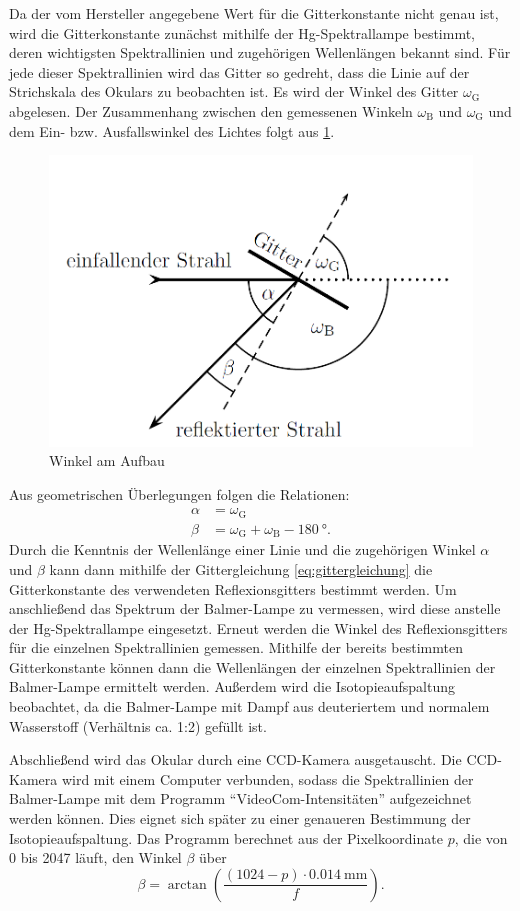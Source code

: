 \indent Da der vom Hersteller angegebene Wert für die Gitterkonstante nicht genau ist, wird die Gitterkonstante zunächst mithilfe der Hg-Spektrallampe bestimmt,
deren wichtigsten Spektrallinien und zugehörigen Wellenlängen bekannt sind. Für jede dieser Spektrallinien wird das Gitter so gedreht, dass die Linie auf der Strichskala
des Okulars zu beobachten ist. Es wird der Winkel des Gitter $\omega_{\mathrm{G}}$ abgelesen. Der Zusammenhang zwischen den gemessenen Winkeln $\omega_{\mathrm{B}}$ und $\omega_{\mathrm{G}}$
und dem Ein- bzw. Ausfallswinkel des Lichtes folgt aus \cref{fig:winkel_am_aufbau}.
\begin{figure}[H]
	\centering
	\includegraphics[width=0.5\linewidth]{../figs/winkel_am_aufbau.png}
	\caption{Winkel am Aufbau \cite{skript}}
	\label{fig:winkel_am_aufbau}
\end{figure} Aus geometrischen Überlegungen folgen die Relationen:
\begin{align}\label{eq:winkel}
    \alpha &= \omega_{\mathrm{G}} \\
    \beta &= \omega_{\mathrm{G}} + \omega_{\mathrm{B}} - \SI{180}{\degree} .
\end{align} Durch die Kenntnis der Wellenlänge einer Linie und die zugehörigen Winkel $\alpha$ und $\beta$ kann dann mithilfe der Gittergleichung \ref{eq:gittergleichung}
die Gitterkonstante des verwendeten Reflexionsgitters bestimmt werden. Um anschließend das Spektrum der Balmer-Lampe zu vermessen, wird diese anstelle der Hg-Spektrallampe eingesetzt.
Erneut werden die Winkel des Reflexionsgitters für die einzelnen Spektrallinien gemessen. Mithilfe der bereits bestimmten Gitterkonstante können dann die Wellenlängen der
einzelnen Spektrallinien der Balmer-Lampe ermittelt werden. Außerdem wird die Isotopieaufspaltung beobachtet, da die Balmer-Lampe mit Dampf aus deuteriertem und normalem Wasserstoff
(Verhältnis  ca. 1:2) gefüllt ist.\par
Abschließend wird das Okular durch eine CCD-Kamera ausgetauscht. Die CCD-Kamera wird mit einem Computer verbunden, sodass die
Spektrallinien der Balmer-Lampe mit dem Programm \enquote{VideoCom-Intensitäten} aufgezeichnet werden können. Dies eignet sich später zu einer genaueren Bestimmung
der Isotopieaufspaltung. Das Programm berechnet aus der Pixelkoordinate $p$, die von 0 bis 2047 läuft, den Winkel $\beta$ über
\begin{equation*}
    \beta = \arctan(\frac{(1024 - p) \cdot \SI{0,014}{\milli \meter}}{f}) .
\end{equation*}

